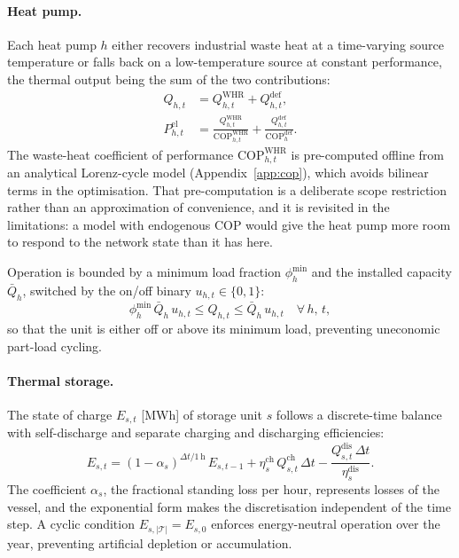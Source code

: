 \paragraph{Heat pump.}
Each heat pump $h$ either recovers industrial waste heat at a time-varying source
temperature or falls back on a low-temperature source at constant performance, the
thermal output being the sum of the two contributions:
\begin{align}
  Q_{h,t} &= Q_{h,t}^{\mathrm{WHR}} + Q_{h,t}^{\mathrm{def}},
  \label{eq:hp_split} \\[4pt]
  P_{h,t}^{\mathrm{el}} &= \frac{Q_{h,t}^{\mathrm{WHR}}}{
    \mathrm{COP}_{h,t}^{\mathrm{WHR}}}
    + \frac{Q_{h,t}^{\mathrm{def}}}{\mathrm{COP}_h^{\mathrm{def}}}.
  \label{eq:hp_pel}
\end{align}
The waste-heat coefficient of performance $\mathrm{COP}_{h,t}^{\mathrm{WHR}}$ is
pre-computed offline from an analytical Lorenz-cycle model
(Appendix~\ref{app:cop}), which avoids bilinear terms in the optimisation. That
pre-computation is a deliberate scope restriction rather than an approximation of
convenience, and it is revisited in the limitations: a model with endogenous COP would
give the heat pump more room to respond to the network state than it has here.

Operation is bounded by a minimum load fraction $\phi_h^{\mathrm{min}}$ and the installed
capacity $\bar{Q}_h$, switched by the on/off binary $u_{h,t} \in \{0,1\}$:
\begin{equation}
  \phi_h^{\mathrm{min}}\, \bar{Q}_h\, u_{h,t}
  \leq Q_{h,t} \leq \bar{Q}_h\, u_{h,t}
  \quad \forall\, h,\, t,
  \label{eq:hp_cap}
\end{equation}
so that the unit is either off or above its minimum load, preventing uneconomic part-load
cycling.

\paragraph{Thermal storage.}
The state of charge $E_{s,t}$ [MWh] of storage unit $s$ follows a discrete-time balance
with self-discharge and separate charging and discharging efficiencies:
\begin{equation}
  E_{s,t} = (1 - \alpha_s)^{\Delta t/\mathrm{1\,h}}\, E_{s,t-1}
    + \eta_s^{\mathrm{ch}}\, Q_{s,t}^{\mathrm{ch}}\, \Delta t
    - \frac{Q_{s,t}^{\mathrm{dis}}\, \Delta t}{\eta_s^{\mathrm{dis}}}.
  \label{eq:storage_soc}
\end{equation}
The coefficient $\alpha_s$, the fractional standing loss per hour, represents losses of
the vessel, and the exponential form makes the discretisation independent of the time step.
A cyclic condition $E_{s,|\mathcal{T}|} = E_{s,0}$ enforces energy-neutral operation over
the year, preventing artificial depletion or accumulation.

